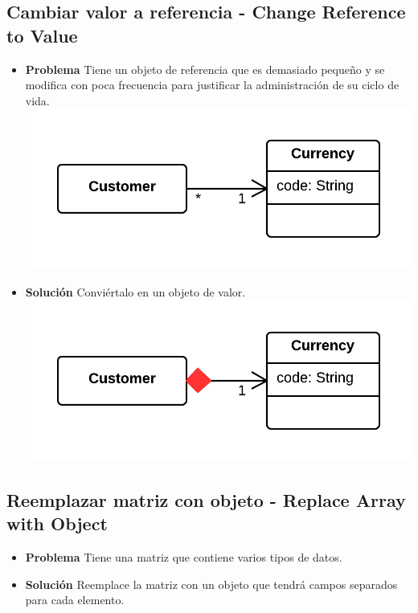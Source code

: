 \documentclass[11pt,a4paper,oneside]{book}
\begin{document}
\subsection{Cambiar valor a referencia - Change Reference to Value}
\label{changereferencetovalue}
\begin{itemize}
    \item \textbf{Problema} Tiene un objeto de referencia que es demasiado pequeño y se modifica con poca frecuencia para justificar la administración de su ciclo de vida.\\
    \centering \includegraphics[scale=0.2]{changereferencetovalueproblem}
    \item \textbf{Solución} Conviértalo en un objeto de valor.\\
    \centering \includegraphics[scale=0.2]{changereferencetovaluesolution}
\end{itemize}
    
\subsection{Reemplazar matriz con objeto - Replace Array with Object}
\label{replacearraywithobject}
\begin{itemize}
    \item \textbf{Problema} Tiene una matriz que contiene varios tipos de datos.
    
    \item \textbf{Solución} Reemplace la matriz con un objeto que tendrá campos separados para cada elemento.
    
\end{itemize}
    
\end{document}
